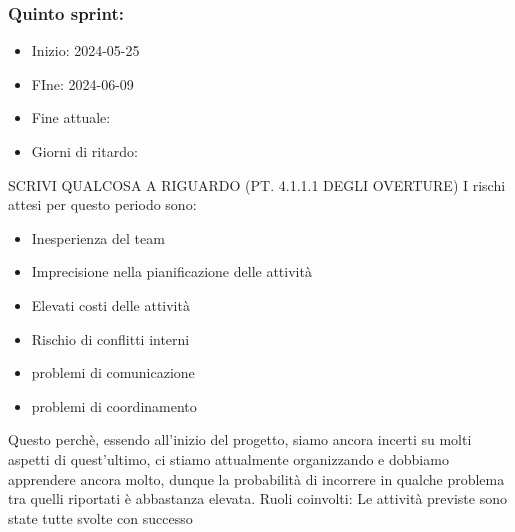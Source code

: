     \subsubsection{Quinto sprint:}
    \begin{itemize}
        \item Inizio: 2024-05-25
        \item FIne: 2024-06-09
        \item Fine attuale:
        \item Giorni di ritardo:
    \end{itemize}
    SCRIVI QUALCOSA A RIGUARDO (PT. 4.1.1.1 DEGLI OVERTURE)
    I rischi attesi per questo periodo sono:
    \begin{itemize}
        \item Inesperienza del team
        \item Imprecisione nella pianificazione delle attività
        \item Elevati costi delle attività
        \item Rischio di conflitti interni 
        \item problemi di comunicazione
        \item problemi di coordinamento
    \end{itemize}
    Questo perchè, essendo all’inizio del progetto, siamo ancora incerti su molti aspetti di quest’ultimo, ci stiamo attualmente organizzando e dobbiamo apprendere ancora molto, dunque la probabilità di incorrere in qualche problema tra quelli riportati è abbastanza elevata.
    Ruoli coinvolti: 
    Le attività previste sono state tutte svolte con successo



